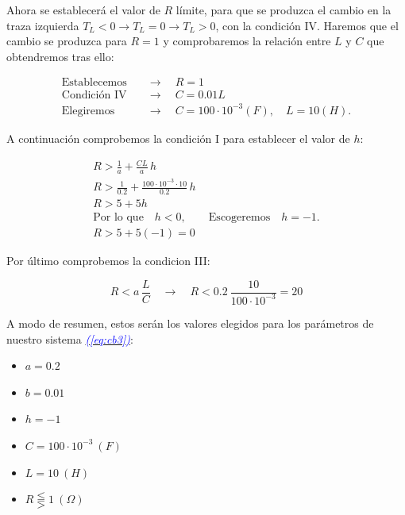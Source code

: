 \documentclass[12pt,a4paper]{report} %
\newcommand{\eref}[1]{\hyperref[#1]{\textcolor{blue}{\textit{(\ref*{#1})}}}}
\begin{document}
	\vspace{0.5cm}\noindent Ahora se establecerá el valor de $R$ límite, para que se produzca el cambio en la traza izquierda $T_L<0 \rightarrow T_L=0 \rightarrow T_L>0$, con la condición IV. Haremos que el cambio se produzca para $R=1$ y comprobaremos la relación entre $L$ y $C$ que obtendremos tras ello:
	
	\begin{equation*}
		\begin{aligned}
			\text{Establecemos} \quad &\longrightarrow \quad R=1 \\[2mm]
			\text{Condición IV} \quad &\longrightarrow \quad C=0.01L\\[2mm]
			\text{Elegiremos} \quad &\longrightarrow \quad C=100\cdot10^{-3}(F), \quad L=10(H).
		\end{aligned}
	\end{equation*}\smallskip
	
	\vspace{0.5cm}\noindent A continuación comprobemos la condición I para establecer el valor de $h$:
	
	\begin{equation*}
	\begin{gathered}
		R>\frac{1}{a}+\frac{CL}{a}\, h\\[3mm] R>\frac{1}{0.2}+\frac{100\cdot10^{-3}\cdot10}{0.2}\, h \\[3mm]
		R>5+5h \\[3mm]
		\text{Por lo que}\quad h<0, \qquad \text{Escogeremos}\quad h=-1.\\[3mm]
		R>5+5(-1)=0
	\end{gathered}
	\end{equation*}\smallskip
	
	\vspace{0.5cm}\noindent Por último comprobemos la condicion III:
	
	\begin{equation*}
		R<a \, \frac{L}{C} \quad \longrightarrow \quad R<0.2\:\frac{10}{100\cdot10^{-3}}=20
	\end{equation*}
	
	\newpage
	
	A modo de resumen, estos serán los valores elegidos para los parámetros de nuestro sistema \eref{eq:cb3}:
	
	\begin{itemize}
		\item $a=0.2$
		\item $b=0.01$
		\item $h=-1$
		\item $C=100\cdot10^{-3}\:(F)$
		\item $L=10\:(H)$
		\item $R\lesseqqgtr1\:(\Omega)$
	\end{itemize}
	
\end{document}
